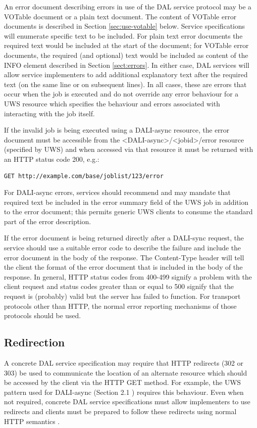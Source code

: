 \documentclass[11pt,letter]{ivoa}
\begin{document}
An error document describing errors in use of the DAL service protocol may be a 
VOTable document \citep{2019ivoa.spec.1021O} or a plain text document. 
The content of 
VOTable error documents is described in Section \ref{sec:use-votable} below. Service 
specifications will enumerate specific text to be included. For plain text error 
documents the required text would be included at the start of the document; for 
VOTable error documents, the required (and optional) text would be included as 
content of the INFO element described in Section \ref{sect:errors}. In either case, DAL 
services will allow service implementers to add additional explanatory text 
after the required text (on the same line or on subsequent lines). In all cases, 
these are errors that occur when the job is executed and do not override any 
error behaviour for a UWS resource which specifies the behaviour and errors 
associated with interacting with the job itself.

If the invalid job is being executed using a DALI-async resource, the error 
document must be accessible from the <DALI-async>/<jobid>/error resource 
(specified by UWS) and when accessed via that resource it must be returned with 
an HTTP status code 200, e.g.:

\begin{verbatim}
GET http://example.com/base/joblist/123/error
\end{verbatim}

For DALI-async errors, services should recommend and may mandate that required 
text be included in the error summary field of the UWS job in addition to the 
error document; this permits generic UWS clients to consume the standard part of 
the error description.

If the error document is being returned directly after a DALI-sync request, the 
service should use a suitable error code to describe the failure and include the 
error document in the body of the response. The Content-Type header will tell 
the client the format of the error document that is included in the body of the 
response. In general, HTTP status codes from 400-499 signify a problem with the 
client request and status codes greater than or equal to 500 signify that the 
request is (probably) valid but the server has failed to function. For transport 
protocols other than HTTP, the normal error reporting mechanisms of those 
protocols should be used.

\subsection{Redirection}
\label{sec:redirects}
A concrete DAL service specification may require that HTTP redirects (302 or 
303) be used to communicate the location of an alternate resource which should 
be accessed by the client via the HTTP GET method. For example, the UWS pattern 
used for DALI-async (Section 2.1 ) requires this behaviour. Even when not 
required, concrete DAL service specifications must allow implementers to use 
redirects and clients must be prepared to follow these redirects using normal 
HTTP semantics \citep{std:HTTP}.
\end{document}
